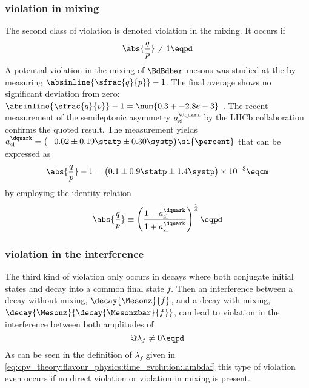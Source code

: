 \subsubsection[\CP violation in mixing]{\CPbfsf violation in mixing}
\label{sec:cpv_theory:flavour_physics:cpv_classification:mixing}

The second class of \CP violation is denoted \CP violation in the mixing. It
occurs if
%
\begin{equation}
  \abs{\frac{q}{p}} \neq 1 \eqpd
\end{equation}
%
A potential \CP violation in the mixing of $\BdBdbar$ mesons was studied at the
\BFactories by measuring $\absinline{\sfrac{q}{p}} - 1$. The final \BFactory
average shows no significant deviation from zero: $\absinline{\sfrac{q}{p}} - 1
= \num{0.3 +- 2.8 e-3}$ \cite{Bevan:2014iga}. The recent measurement of the
semileptonic \CP asymmetry $a_{\text{sl}}^{\dquark}$ by the \acs*{LHCb}
collaboration confirms the quoted result. The measurement yields
$a_{\text{sl}}^{\dquark} = \bigl(-0.02 \pm 0.19 \statp \pm 0.30 \systp
\bigr)\si{\percent}$ \cite{Aaij:2014nxa} that can be expressed as
%
\begin{equation}
  \abs{\frac{q}{p}} - 1 = \bigl(0.1 \pm 0.9 \statp \pm 1.4 \systp \bigr) \times 10^{-3} \eqcm
\end{equation}
%
by employing the identity relation
%
\begin{equation}
  \abs{\frac{q}{p}} \equiv \left(\frac{1 - a_{\text{sl}}^{\dquark}}{1 + a_{\text{sl}}^{\dquark}}\right)^{\frac{1}{4}} \eqpd
\end{equation}
%

\subsubsection[\CP violation in the interference]{\CPbfsf violation in the interference}
\label{sec:cpv_theory:flavour_physics:cpv_classification:interference}

The third kind of \CP violation only occurs in decays where both \CP conjugate
initial states \Mesonz and \Mesonzbar decay into a common final state $f$. Then
an interference between a decay without mixing, $\decay{\Mesonz}{f}$, and a
decay with mixing, $\decay{\Mesonz}{\decay{\Mesonzbar}{f}}$, can lead to \CP
violation in the interference between both amplitudes of:
%
\begin{equation}
  \Im \lambda_f \neq 0 \eqpd
\end{equation}
%
As can be seen in the definition of $\lambda_f$ given in
\cref{eq:cpv_theory:flavour_physics:time_evolution:lambdaf} this type of \CP
violation even occurs if no direct \CP violation or \CP violation in mixing is
present.
